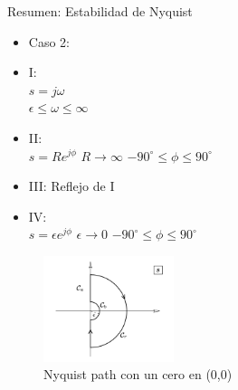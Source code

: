 \documentclass{beamer}
\begin{document}
\begin{frame}{Resumen: Estabilidad de Nyquist}
\begin{justify}
\begin{multicols}{2}
\begin{itemize}
    \item Caso 2:
    \item I:
    \\
    $s=j\omega$
    \\
    $\epsilon\leq\omega\leq\infty$  
    \\
    \item II:
    \\
    $s=Re^{j\phi}$
    $R\rightarrow\infty$
    $-90^\circ\leq\phi\leq90^\circ$     
    \\
    \item III:
    Reflejo de I
    \\
    \item IV:
    \\
    $s=\epsilon e^{j\phi}$
    $\epsilon \rightarrow 0$
    $-90^\circ\leq\phi\leq90^\circ$  
\end{itemize}

\begin{itemize}
    \begin{figure}[H]
    \centering
    \includegraphics[width=1.5in]{imagenes/nyquist-modificado.png}
    \caption{Nyquist path con un cero en (0,0)}
    \label{niquist-function}
    \end{figure}
\end{itemize}
\end{multicols}
\end{justify}
\end{frame}
\end{document}
